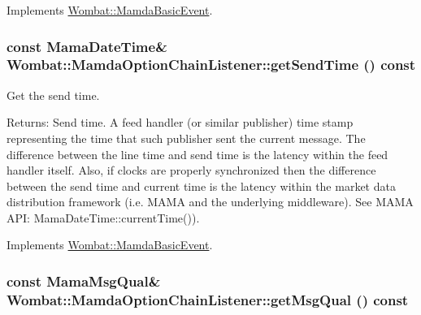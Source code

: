 Implements \hyperlink{classWombat_1_1MamdaBasicEvent_3fcc26fa1a6446bcec12b11ac74ed26d}{Wombat::Mamda\-Basic\-Event}.\hypertarget{classWombat_1_1MamdaOptionChainListener_81cfb2c76079da7867841b94da24b6de}{
\subsubsection[getSendTime]{\setlength{\rightskip}{0pt plus 5cm}const Mama\-Date\-Time\& Wombat::Mamda\-Option\-Chain\-Listener::get\-Send\-Time () const}}
\label{classWombat_1_1MamdaOptionChainListener_81cfb2c76079da7867841b94da24b6de}


Get the send time. 

\begin{Desc}
\item[Returns:]Send time. A feed handler (or similar publisher) time stamp representing the time that such publisher sent the current message. The difference between the line time and send time is the latency within the feed handler itself. Also, if clocks are properly synchronized then the difference between the send time and current time is the latency within the market data distribution framework (i.e. MAMA and the underlying middleware). See MAMA API: Mama\-Date\-Time::current\-Time()). \end{Desc}


Implements \hyperlink{classWombat_1_1MamdaBasicEvent_b0602a83bec20cd8b341ec866ff3bffa}{Wombat::Mamda\-Basic\-Event}.\hypertarget{classWombat_1_1MamdaOptionChainListener_18b3d2b0c1db64719b2693e89d5583e5}{
\subsubsection[getMsgQual]{\setlength{\rightskip}{0pt plus 5cm}const Mama\-Msg\-Qual\& Wombat::Mamda\-Option\-Chain\-Listener::get\-Msg\-Qual () const}}
\label{classWombat_1_1MamdaOptionChainListener_18b3d2b0c1db64719b2693e89d5583e5}


